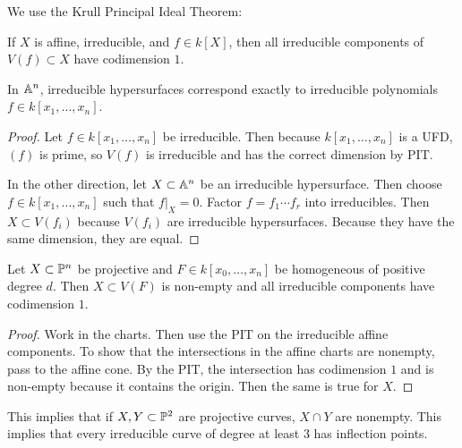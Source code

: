 \documentclass[twoside, 10pt]{article}
\begin{document}
    We use the Krull Principal Ideal Theorem: \begin{thm} If $X$ is affine, irreducible, and $f \in k[X]$, then all
irreducible components of $V(f) \subset X$ have codimension $1$.  \end{thm}

    \begin{cor} In $\A^n$, irreducible hypersurfaces correspond exactly to
        irreducible polynomials $f \in k[x_1, \ldots, x_n]$.  \begin{proof} Let
            $f \in k[x_1, \ldots, x_n]$ be irreducible. Then because $k[x_1,
            \ldots, x_n]$ is a UFD, $(f)$ is prime, so $V(f)$ is irreducible
            and has the correct dimension by PIT.

            In the other direction, let $X \subset \A^n$ be an irreducible
            hypersurface. Then choose $f \in k[x_1, \ldots, x_n]$ such that
            $f|_X = 0$. Factor $f = f_1\cdots f_r$ into irreducibles. Then $X
            \subset V(f_i)$ because $V(f_i)$ are irreducible hypersurfaces.
        Because they have the same dimension, they are equal.  \end{proof}
    \end{cor}

    \begin{cor} Let $X \subset \P^n$ be projective and $F \in k[x_0, \ldots,
        x_n]$ be homogeneous of positive degree $d$. Then $X \subset V(F)$ is
        non-empty and all irreducible components have codimension $1$.
        \begin{proof} Work in the charts. Then use the PIT on the irreducible
            affine components. To show that the intersections in the affine
            charts are nonempty, pass to the affine cone. By the PIT, the
            intersection has codimension $1$ and is non-empty because it
            contains the origin.  Then the same is true for $X$.  \end{proof}
        \end{cor}

    \begin{rmk} This implies that if $X,Y \subset \P^2$ are projective curves,
    $X \cap Y$ are nonempty. This implies that every irreducible curve of
degree at least $3$ has inflection points.  \end{rmk}
\end{document}
